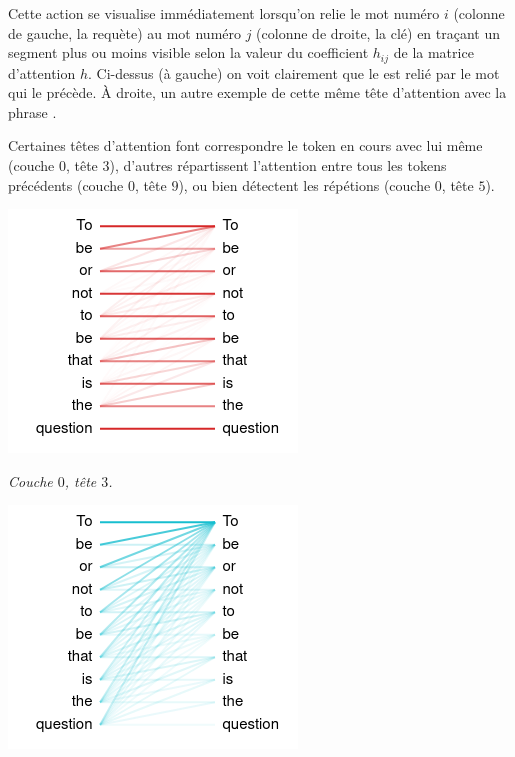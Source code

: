 \documentclass[11pt,class=report,crop=false]{standalone}
\begin{document}
Cette action se visualise immédiatement lorsqu'on relie le mot numéro $i$ (colonne de gauche, la requète) au mot numéro $j$ (colonne de droite, la clé) en traçant un segment plus ou moins visible selon la valeur du coefficient $h_{ij}$ de la matrice d'attention $h$. Ci-dessus (à gauche) on voit clairement que le  est relié par le mot  qui le précède. À droite, un autre exemple de cette même tête d'attention avec la phrase .


Certaines têtes d'attention font correspondre le token en cours avec lui même (couche $0$, tête $3$), d'autres répartissent l'attention entre tous les tokens précédents (couche $0$, tête $9$), ou bien détectent les répétions (couche $0$, tête $5$). 

\begin{center}
	\begin{minipage}{0.3\textwidth}
	\center
	\includegraphics[scale=\myscale,scale=0.5]{figures/attention_l0_h3}
	
	\emph{Couche $0$, tête $3$.}
	\end{minipage}
	\quad
	\begin{minipage}{0.3\textwidth}
	\center
	\includegraphics[scale=\myscale,scale=0.5]{figures/attention_l0_h9}
	

\end{minipage}
\end{center}
\end{document}
